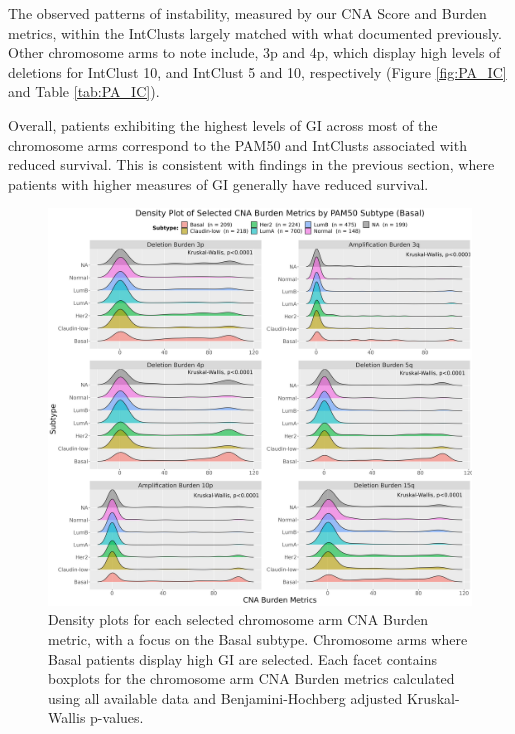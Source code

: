 The observed patterns of instability, measured by our CNA Score and Burden metrics, within the IntClusts largely matched with what \cite{pmid22522925} documented previously. Other chromosome arms to note include, 3p and 4p, which display high levels of deletions for IntClust 10, and IntClust 5 and 10, respectively (Figure \ref{fig:PA_IC} and Table \ref{tab:PA_IC}). 

Overall, patients exhibiting the highest levels of GI across most of the chromosome arms correspond to the PAM50 and IntClusts associated with reduced survival. This is consistent with findings in the previous section, where patients with higher measures of GI generally have reduced survival.

\vfill
\begin{figure}[!h]
\center
\includegraphics[width=1\textwidth]{../figures/Chapter_2/ChrArm_CNA_Burden_Metrics_Across_PAM50_Basal_Burden.png}
\caption[Density plots for each selected chromosome arm CNA Burden metric, with a focus on the Basal subtype.]{Density plots for each selected chromosome arm CNA Burden metric, with a focus on the Basal subtype. Chromosome arms where Basal patients display high GI are selected. Each facet contains boxplots for the chromosome arm CNA Burden metrics calculated using all available data and Benjamini-Hochberg adjusted Kruskal-Wallis p-values.}
\label{fig:PA-CNA-Score-Metric-Density-P50-5q}
\end{figure}
\vfill

